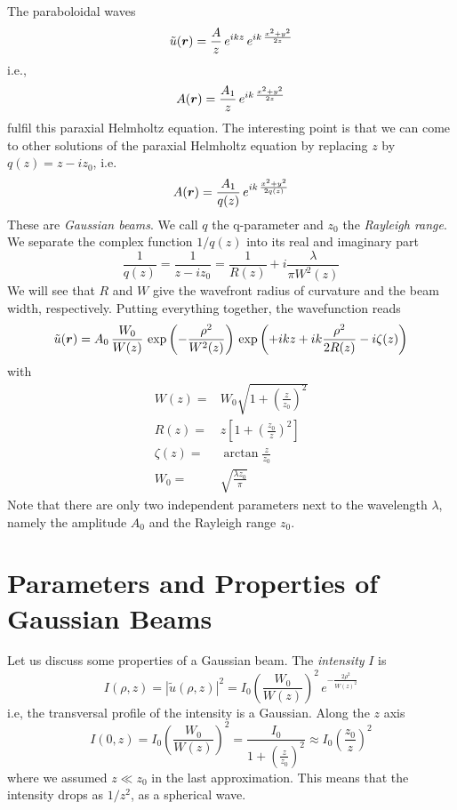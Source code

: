 The paraboloidal waves 
\begin{equation}
    \tilde{u}(\boldsymbol{r}) = \frac{A}{z} \, e^{i k z} \, e^{i k \, \frac{x^2 + y^2}{2z}  }
\end{equation}
i.e.,
\begin{equation}
    A(\boldsymbol{r}) = \frac{A_1}{z}  \, e^{i k \, \frac{x^2 + y^2}{2z}  }
\end{equation}
fulfil this paraxial Helmholtz equation. The interesting point is that we can come to other solutions of the paraxial Helmholtz equation by replacing $z$ by $q(z) = z - i z_0$, i.e.
\begin{equation}
    A(\boldsymbol{r}) = \frac{A_1}{q(z)}  \, e^{i k \, \frac{x^2 + y^2}{2q(z)}  }
\end{equation}
These are \emph{Gaussian beams}. We call $q$ the q-parameter and $z_0$ the \emph{Rayleigh range}. We separate the complex function $1/q(z)$ into its real and imaginary part
\begin{equation}
    \frac{1}{q(z)} = \frac{1}{z -i z_0} = \frac{1}{R(z)} + i \frac{\lambda}{\pi W^2(z)}
\end{equation}
We will see that $R$ and $W$ give the wavefront radius of curvature and the beam width, respectively. Putting everything together, the wavefunction reads
\begin{equation}
    \tilde{u}(\boldsymbol{r}) = A_0 \, \frac{W_0}{W(z)} \, 
    \exp \left( - \frac{\rho^2}{W^2(z)}  \right) \, 
    \exp \left( +i kz +ik  \frac{\rho^2}{2 R(z)}  - i \zeta(z) \right) 
\end{equation}
with
\begin{align}
    W(z) = & W_0 \sqrt{1 + \left( \frac{z}{z_0} \right)^2    } \\
    R(z) = & z \left[ 1 + \left( \frac{z_0}{z} \right)^2 \right] \\
    \zeta(z) = & \arctan \frac{z}{z_0} \\
    W_0 = & \sqrt{\frac{\lambda z_0}{\pi}}
\end{align}
Note that there are only two independent parameters next to the wavelength $\lambda$, namely the amplitude $A_0$ and the Rayleigh range $z_0$.



\section{Parameters and Properties of Gaussian Beams}

Let us discuss some properties of a Gaussian beam. The \emph{intensity} $I$ is
\begin{equation}
    I(\rho, z) = | \tilde{u}(\rho, z) |^2 = I_0 \left( \frac{W_0}{W(z)}  \right)^2 \, e^{- \frac{2 \rho^2}{W(z)^2} }
\end{equation}
i.e, the transversal profile of the intensity is a Gaussian. Along the $z$ axis
\begin{equation}
    I(0, z) =  I_0 \left( \frac{W_0}{W(z)} \right)^2= \frac{I_0}{1 + \left( \frac{z}{z_0} \right)^2}  \approx I_0  \left( \frac{z_0}{z} \right)^2
\end{equation}
where we assumed $z \ll z_0$ in the last approximation. This means that the intensity drops as $1/z^2$, as a spherical wave.

